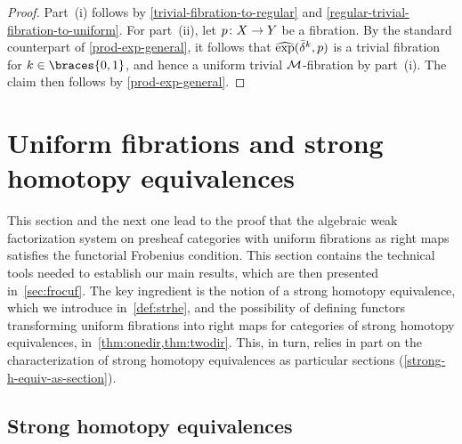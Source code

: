 \documentclass[reqno,10pt,a4paper,oneside,draft]{amsart}
\begin{document}
\begin{proof}
Part~(i) follows by \cref{trivial-fibration-to-regular} and \cref{regular-trivial-fibration-to-uniform}.
For part~(ii), let $p \co X \to Y$ be a fibration.
By the standard counterpart of \cref{prod-exp-general}, it follows that $\hatexp(\bar{\delta}^k, p)$ is a trivial fibration for $k \in \braces{0, 1}$, and hence a uniform trivial $\cal{M}$-fibration by part~(i).
The claim then follows by \cref{prod-exp-general}.
\end{proof}

\section{Uniform fibrations and strong homotopy equivalences}
\label{sec:unifshe}

This section and the next one lead to the proof that the algebraic weak factorization system on presheaf categories with uniform fibrations as right maps satisfies the functorial Frobenius condition.
This section contains the technical tools needed to establish our main results, which are then presented in~\cref{sec:frocuf}.
The key ingredient is the notion of a strong homotopy equivalence, which we introduce in~\cref{def:strhe}, and the possibility of defining functors transforming uniform fibrations into right maps for categories of strong homotopy equivalences, in~\cref{thm:onedir,thm:twodir}.
This, in turn, relies in part on the characterization of strong homotopy equivalences as particular sections (\cref{strong-h-equiv-as-section}).

\subsection*{Strong homotopy equivalences}
\end{document}
